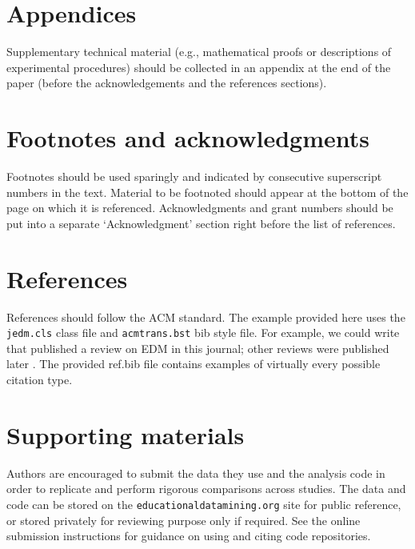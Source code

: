 \documentclass[notitlepage,12pt]{jedm}
\begin{document}
\section{Appendices}

Supplementary technical material (e.g., mathematical proofs or descriptions of experimental procedures) should be collected in an appendix at the end of the paper (before the acknowledgements and the references sections).

\section{Footnotes and acknowledgments}

Footnotes should be used sparingly and indicated by consecutive superscript numbers in the text. Material to be footnoted should appear at the bottom of the page on which it is referenced. Acknowledgments and grant numbers should be put into a separate `Acknowledgment' section right before the list of references.

\section{References}

References should follow the ACM standard.  The example provided here uses the \texttt{jedm.cls} class file and \texttt{acmtrans.bst} bib style file.  For example, we could write that  published a review on EDM in this journal; other reviews were published later \cite[for eg.]{romero2010educational}. The provided ref.bib file contains examples of virtually every possible citation type.


\section{Supporting materials}

Authors are encouraged to submit the data they use and the analysis code in order to replicate and perform rigorous comparisons across studies.  The data and code can be stored on the \texttt{educationaldatamining.org} site for public reference, or stored privately for reviewing purpose only if required. See the online submission instructions for guidance on using and citing code repositories.
\end{document}
